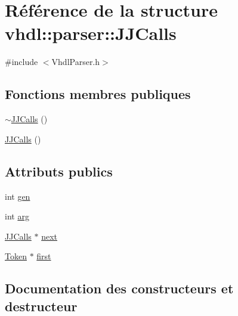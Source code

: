 \hypertarget{structvhdl_1_1parser_1_1_j_j_calls}{}\section{Référence de la structure vhdl\+:\+:parser\+:\+:J\+J\+Calls}
\label{structvhdl_1_1parser_1_1_j_j_calls}


{\ttfamily \#include $<$Vhdl\+Parser.\+h$>$}

\subsection*{Fonctions membres publiques}
\begin{DoxyCompactItemize}
\item 
\hyperlink{structvhdl_1_1parser_1_1_j_j_calls_a953e9b05e336c11f8e2435b3ea506bc1}{$\sim$\+J\+J\+Calls} ()
\item 
\hyperlink{structvhdl_1_1parser_1_1_j_j_calls_aaaa2b2b81198a1e2a706a91baa09712c}{J\+J\+Calls} ()
\end{DoxyCompactItemize}
\subsection*{Attributs publics}
\begin{DoxyCompactItemize}
\item 
int \hyperlink{structvhdl_1_1parser_1_1_j_j_calls_a5d25b6278ae014a14a0f5be2678f663c}{gen}
\item 
int \hyperlink{structvhdl_1_1parser_1_1_j_j_calls_a952889761822083d0eb8175cc62e6b7f}{arg}
\item 
\hyperlink{structvhdl_1_1parser_1_1_j_j_calls}{J\+J\+Calls} $\ast$ \hyperlink{structvhdl_1_1parser_1_1_j_j_calls_a6b6a95b77fab1e71ce05bd43da1b8f67}{next}
\item 
\hyperlink{classvhdl_1_1parser_1_1_token}{Token} $\ast$ \hyperlink{structvhdl_1_1parser_1_1_j_j_calls_a0994fa11976ac659180bf73c1068783e}{first}
\end{DoxyCompactItemize}


\subsection{Documentation des constructeurs et destructeur}
\hypertarget{structvhdl_1_1parser_1_1_j_j_calls_a953e9b05e336c11f8e2435b3ea506bc1}{}
